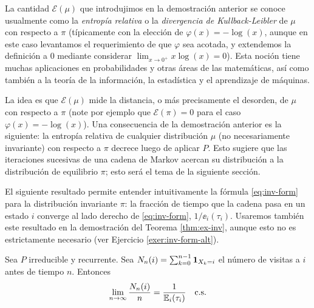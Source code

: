 \begin{rem}\label{rem:entropia}
La cantidad $\mathcal{E}(\mu)$ que introdujimos en la demostración anterior se conoce usualmente como la \emph{entropía relativa} o la \emph{divergencia de Kullback-Leibler} de $\mu$ con respecto a $\pi$ (típicamente con la elección de $\varphi(x)=-\log(x)$, aunque en este caso levantamos el requerimiento de que $\varphi$ sea acotada, y extendemos la definición a $0$ mediante considerar $\lim_{x\to0^+}x\log(x)=0$).
Esta noción tiene muchas aplicaciones en probabilidades y otras áreas de las matemáticas, así como también a la teoría de la información, la estadística y el aprendizaje de máquinas.

\noindent La idea es que $\mathcal{E}(\mu)$ mide la distancia, o más precisamente el desorden, de $\mu$ con respecto a $\pi$ (note por ejemplo que $\mathcal{E}(\pi)=0$ para el caso $\varphi(x)=-\log(x)$).
Una consecuencia de la demostración anterior es la siguiente: la entropía relativa de cualquier distribución $\mu$ (no necesariamente invariante) con respecto a $\pi$ decrece luego de aplicar $P$.
Esto sugiere que las iteraciones sucesivas de una cadena de Markov acercan su distribución a la distribución de equilibrio $\pi$; esto será el tema de la siguiente sección.
\end{rem}

El siguiente resultado permite entender intuitivamente la fórmula \eqref{eq:inv-form} para la distribución invariante $\pi$: la fracción de tiempo que la cadena pasa en un estado $i$ converge al lado derecho de \eqref{eq:inv-form}, $1/\ee_i(\tau_i)$.
Usaremos también este resultado en la demostración del Teorema \ref{thm:ex-inv}, aunque esto no es estrictamente necesario (ver Ejercicio \ref{exer:inv-form-alt}).

\begin{prop}\label{prop:timeconv}
Sea $P$ irreducible y recurrente.
Sea $N_n(i)=\sum_{k=0}^{n-1}\mathbf{1}_{X_k=i}$ el número de visitas a $i$ antes de tiempo $n$.
Entonces
\[\lim_{n\to\infty}\frac{N_n(i)}{n}=\frac1{\mathbb{E}_i(\tau_i)}\quad\text{\upshape{c.s.}}\]
\end{prop}


